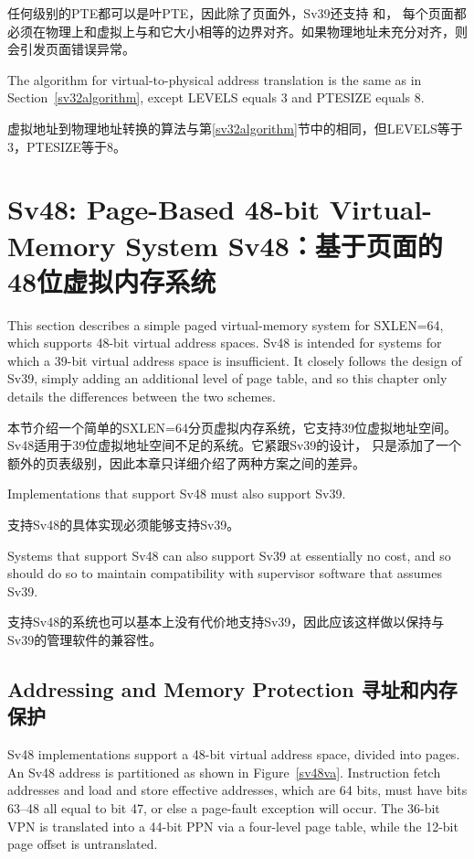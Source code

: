 任何级别的PTE都可以是叶PTE，因此除了页面外，Sv39还支持 和，
每个页面都必须在物理上和虚拟上与和它大小相等的边界对齐。如果物理地址未充分对齐，则会引发页面错误异常。

The algorithm for virtual-to-physical address translation is the same as in
Section~\ref{sv32algorithm}, except LEVELS equals 3 and PTESIZE equals 8.

虚拟地址到物理地址转换的算法与第\ref{sv32algorithm}节中的相同，但LEVELS等于3，PTESIZE等于8。

\section{Sv48: Page-Based 48-bit Virtual-Memory System Sv48：基于页面的48位虚拟内存系统}
\label{sec:sv48}

This section describes a simple paged virtual-memory system
for SXLEN=64, which supports 48-bit virtual address spaces.  Sv48
is intended for systems for which a 39-bit virtual address space is
insufficient.  It closely follows the design of Sv39, simply adding an
additional level of page table, and so this chapter only details the
differences between the two schemes.

本节介绍一个简单的SXLEN=64分页虚拟内存系统，它支持39位虚拟地址空间。
Sv48适用于39位虚拟地址空间不足的系统。它紧跟Sv39的设计，
只是添加了一个额外的页表级别，因此本章只详细介绍了两种方案之间的差异。

Implementations that support Sv48 must also support Sv39.

支持Sv48的具体实现必须能够支持Sv39。

\begin{commentary}
Systems that support Sv48 can also support Sv39 at essentially no cost, and so
should do so to maintain compatibility with supervisor software that assumes
Sv39.

支持Sv48的系统也可以基本上没有代价地支持Sv39，因此应该这样做以保持与Sv39的管理软件的兼容性。 
\end{commentary}

\subsection{Addressing and Memory Protection 寻址和内存保护}

Sv48 implementations support a 48-bit virtual address space, divided
into  pages.  An Sv48 address is partitioned as
shown in Figure~\ref{sv48va}.
Instruction fetch addresses and load and store effective addresses,
which are 64 bits, must have bits 63--48 all equal to bit 47, or else
a page-fault exception will occur.  The 36-bit VPN is translated into a
44-bit PPN via a four-level page table, while the 12-bit page offset
is untranslated.

